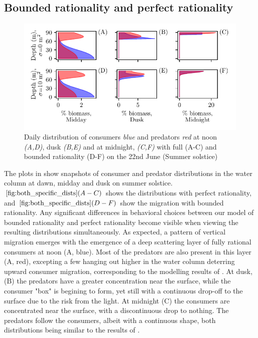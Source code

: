 \subsection{Bounded rationality and perfect rationality}
\begin{figure}[H]
\includegraphics{plots/both_specific_dists.pdf}
\caption{Daily distribution of consumers \emph{blue} and predators \emph{red} at noon \emph{(A,D)}, dusk \emph{(B,E)} and at midnight, \emph{(C,F)} with full (A-C) and bounded rationality (D-F) on the 22nd June (Summer solstice)}
\label{fig:both_specific_dists}
\end{figure}
The plots in  show snapshots of consumer and predator distributions in the water column at dawn, midday and dusk on summer solstice. $\Cref{fig:both_specific_dists} (A-C)$ shows the distributions with perfect rationality, and $\Cref{fig:both_specific_dists} (D-F)$ show the migration with bounded rationality. Any significant differences in behavioral choices between our model of bounded rationality and perfect rationality become visible when viewing the resulting distributions simultaneously. As expected, a pattern of vertical migration emerges with the emergence of a deep scattering layer of fully rational consumers at noon (A, blue). Most of the predators are also present in this layer (A, red), excepting a few hanging out higher in the water column deterring upward consumer migration, corresponding to the modelling results of \citep{jerome}. At dusk, (B) the predators have a greater concentration near the surface, while the consumer "box" is begining to form, yet still with a continuous drop-off to the surface due to the risk from the light. At midnight (C) the consumers are concentrated near the surface, with a discontinuous drop to nothing. The predators follow the consumers, albeit with a continuous shape, both distributions being similar to the results of \citep{verticalmigration}.


